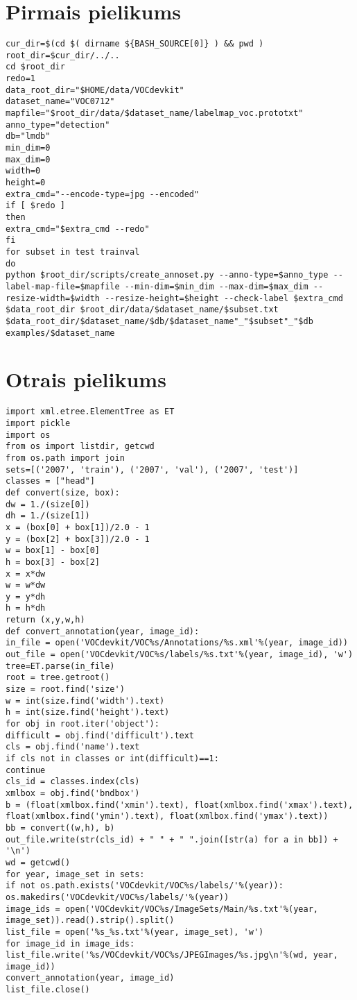\documentclass[12pt,paper=a4]{report}
\newcounter{nofappendices}
\begin{document}
\label{LastPage}

\appendix
\chapter{Pirmais pielikums}
\label{appendix:pielikums1}
\begin{lstlisting}[basicstyle=\tiny]
cur_dir=$(cd $( dirname ${BASH_SOURCE[0]} ) && pwd )
root_dir=$cur_dir/../..
cd $root_dir
redo=1
data_root_dir="$HOME/data/VOCdevkit"
dataset_name="VOC0712"
mapfile="$root_dir/data/$dataset_name/labelmap_voc.prototxt"
anno_type="detection"
db="lmdb"
min_dim=0
max_dim=0
width=0
height=0
extra_cmd="--encode-type=jpg --encoded"
if [ $redo ]
then
extra_cmd="$extra_cmd --redo"
fi
for subset in test trainval
do
python $root_dir/scripts/create_annoset.py --anno-type=$anno_type --label-map-file=$mapfile --min-dim=$min_dim --max-dim=$max_dim --resize-width=$width --resize-height=$height --check-label $extra_cmd $data_root_dir $root_dir/data/$dataset_name/$subset.txt $data_root_dir/$dataset_name/$db/$dataset_name"_"$subset"_"$db examples/$dataset_name
\end{lstlisting}
\addtocounter{nofappendices}{1}
\chapter{Otrais pielikums}
\label{appendix:pielikums2}
\begin{lstlisting}[basicstyle=\tiny]
import xml.etree.ElementTree as ET
import pickle
import os
from os import listdir, getcwd
from os.path import join
sets=[('2007', 'train'), ('2007', 'val'), ('2007', 'test')]
classes = ["head"]
def convert(size, box):
dw = 1./(size[0])
dh = 1./(size[1])
x = (box[0] + box[1])/2.0 - 1
y = (box[2] + box[3])/2.0 - 1
w = box[1] - box[0]
h = box[3] - box[2]
x = x*dw
w = w*dw
y = y*dh
h = h*dh
return (x,y,w,h)
def convert_annotation(year, image_id):
in_file = open('VOCdevkit/VOC%s/Annotations/%s.xml'%(year, image_id))
out_file = open('VOCdevkit/VOC%s/labels/%s.txt'%(year, image_id), 'w')
tree=ET.parse(in_file)
root = tree.getroot()
size = root.find('size')
w = int(size.find('width').text)
h = int(size.find('height').text)
for obj in root.iter('object'):
difficult = obj.find('difficult').text
cls = obj.find('name').text
if cls not in classes or int(difficult)==1:
continue
cls_id = classes.index(cls)
xmlbox = obj.find('bndbox')
b = (float(xmlbox.find('xmin').text), float(xmlbox.find('xmax').text), float(xmlbox.find('ymin').text), float(xmlbox.find('ymax').text))
bb = convert((w,h), b)
out_file.write(str(cls_id) + " " + " ".join([str(a) for a in bb]) + '\n')
wd = getcwd()
for year, image_set in sets:
if not os.path.exists('VOCdevkit/VOC%s/labels/'%(year)):
os.makedirs('VOCdevkit/VOC%s/labels/'%(year))
image_ids = open('VOCdevkit/VOC%s/ImageSets/Main/%s.txt'%(year, image_set)).read().strip().split()
list_file = open('%s_%s.txt'%(year, image_set), 'w')
for image_id in image_ids:
list_file.write('%s/VOCdevkit/VOC%s/JPEGImages/%s.jpg\n'%(wd, year, image_id))
convert_annotation(year, image_id)
list_file.close()
\end{lstlisting}
\end{document}
